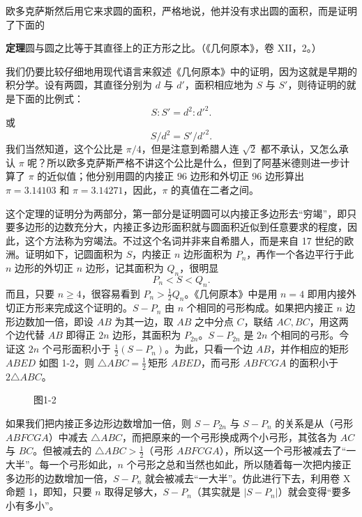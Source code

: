 欧多克萨斯然后用它来求圆的面积，严格地说，他并没有求出圆的面积，而是证明了下面的

\textbf{定理}\quad 圆与圆之比等于其直径上的正方形之比。（《几何原本》，卷 XII，2。）

我们仍要比较仔细地用现代语言来叙述《几何原本》中的证明，因为这就是早期的积分学。设有两圆，其直径分别为 $d$ 与 $d'$，面积相应地为 $S$ 与 $S'$，则待证明的就是下面的比例式：
\[
S:S'=d^2:d'^2. \tag{1}
\]
或
\[
S/d^2=S'/d'^2. \tag{2}
\]
我们当然知道，这个公比是 $\pi/4$，但是注意到希腊人连 $\sqrt2$ 都不承认，又怎么承认 $\pi$ 呢？所以欧多克萨斯严格不讲这个公比是什么，但到了阿基米德则进一步计算了 $\pi$ 的近似值；他分别用圆的内接正 $96$ 边形和外切正 $96$ 边形算出 $\pi=3.14103$ 和 $\pi=3.14271$，因此，$\pi$ 的真值在二者之间。

这个定理的证明分为两部分，第一部分是证明圆可以内接正多边形去“穷竭”，即只要多边形的边数充分大，内接正多边形面积就与圆面积近似到任意要求的程度，因此，这个方法称为穷竭法。不过这个名词并非来自希腊人，而是来自 17 世纪的欧洲。证明如下，记圆面积为 $S$，内接正 $n$ 边形面积为 $P_n$，再作一个各边平行于此 $n$ 边形的外切正 $n$ 边形，记其面积为 $Q_n$，很明显
\[
P_n<S<Q_n. \tag{3}
\]
而且，只要 $n\geq4$，很容易看到 $P_n>\frac12Q_n$。《几何原本》中是用 $n=4$ 即用内接外切正方形来完成这个证明的。$S-P_n$ 由 $n$ 个相同的弓形构成。如果把内接正 $n$ 边形边数加一倍，即设 $AB$ 为其一边，取 $AB$ 之中分点 $C$，联结 $AC,BC$，用这两个边代替 $AB$ 即得正 $2n$ 边形，其面积为 $P_{2n}$。$S-P_{2n}$ 是 $2n$ 个相同的弓形。今证这 $2n$ 个弓形面积小于 $\frac12(S-P_n)$。为此，只看一个边 $AB$，并作相应的矩形 $ABED$ 如图 1-2，则 $\triangle ABC=\frac12\,\text{矩形 }ABED$，而弓形 $ABFCGA$ 的面积小于 $2\triangle ABC$。

\begin{figure}[htbp]
\centering
{}
\caption*{图1-2}
\end{figure}

如果我们把内接正多边形边数增加一倍，则 $S-P_{2n}$ 与 $S-P_n$ 的关系是从（弓形 $ABFCGA$）中减去 $\triangle ABC$，而把原来的一个弓形换成两个小弓形，其弦各为 $AC$ 与 $BC$。但被减去的 $\triangle ABC>\frac12$（弓形 $ABFCGA$），所以这一个弓形被减去了“一大半”。每一个弓形如此，$n$ 个弓形之总和当然也如此，所以随着每一次把内接正多边形的边数增加一倍，$S-P_n$ 就会被减去“一大半”。仿此进行下去，利用卷 X 命题 1，即知，只要 $n$ 取得足够大，$S-P_n$（其实就是 $|S-P_n|$）就会变得“要多小有多小”。

